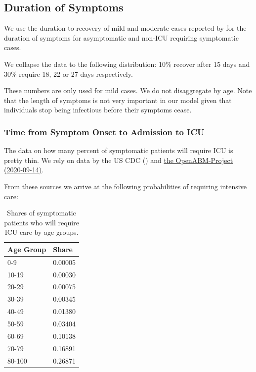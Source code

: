 \subsection{Duration of Symptoms}

We use the duration to recovery of mild and moderate cases reported by \cite[Figure~S3, Panel~2]{Bi2020} for the duration of symptoms for asymptomatic and non-ICU requiring symptomatic cases.

We collapse the data to the following distribution: 10\% recover after 15 days and 30\% require 18, 22 or 27 days respectively.


These numbers are only used for mild cases. We do not disaggregate by age. Note that the length of symptoms is not very important in our model given that individuals stop being infectious before their symptoms cease.


\subsubsection{Time from Symptom Onset to Admission to ICU}

The data on how many percent of symptomatic patients will require ICU is pretty thin. We rely on data by the US CDC (\cite{Stokes2020}) and \href{https://github.com/BDI-pathogens/OpenABM-Covid19/blob/master/documentation/parameters/parameter_dictionary.md}{the OpenABM-Project (2020-09-14)}.

From these sources we arrive at the following probabilities of requiring intensive care:

\begin{table}[!ht]
    \caption{Shares of symptomatic patients who will require ICU care by age groups.}
    \label{tab:symptomatic-to-ICU}
    \centering

    \begin{tabular}{ll}
        \toprule
        Age Group & Share \\
        \midrule
        0-9 & 0.00005 \\
        10-19 & 0.00030 \\
        20-29 & 0.00075 \\
        30-39 & 0.00345 \\
        40-49 & 0.01380 \\
        50-59 & 0.03404 \\
        60-69 & 0.10138 \\
        70-79 & 0.16891 \\
        80-100 & 0.26871 \\
        \bottomrule
    \end{tabular}

\end{table}

